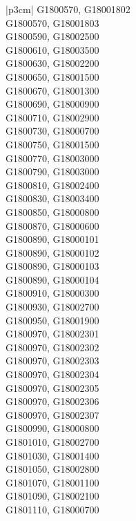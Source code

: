 \begin{customLongTable}{ |p{3cm}| }
G1800570, G18001802 \\ \hline
G1800570, G18001803 \\ \hline
G1800590, G18002500 \\ \hline
G1800610, G18003500 \\ \hline
G1800630, G18002200 \\ \hline
G1800650, G18001500 \\ \hline
G1800670, G18001300 \\ \hline
G1800690, G18000900 \\ \hline
G1800710, G18002900 \\ \hline
G1800730, G18000700 \\ \hline
G1800750, G18001500 \\ \hline
G1800770, G18003000 \\ \hline
G1800790, G18003000 \\ \hline
G1800810, G18002400 \\ \hline
G1800830, G18003400 \\ \hline
G1800850, G18000800 \\ \hline
G1800870, G18000600 \\ \hline
G1800890, G18000101 \\ \hline
G1800890, G18000102 \\ \hline
G1800890, G18000103 \\ \hline
G1800890, G18000104 \\ \hline
G1800910, G18000300 \\ \hline
G1800930, G18002700 \\ \hline
G1800950, G18001900 \\ \hline
G1800970, G18002301 \\ \hline
G1800970, G18002302 \\ \hline
G1800970, G18002303 \\ \hline
G1800970, G18002304 \\ \hline
G1800970, G18002305 \\ \hline
G1800970, G18002306 \\ \hline
G1800970, G18002307 \\ \hline
G1800990, G18000800 \\ \hline
G1801010, G18002700 \\ \hline
G1801030, G18001400 \\ \hline
G1801050, G18002800 \\ \hline
G1801070, G18001100 \\ \hline
G1801090, G18002100 \\ \hline
G1801110, G18000700 \\ \hline

\end{customLongTable}
